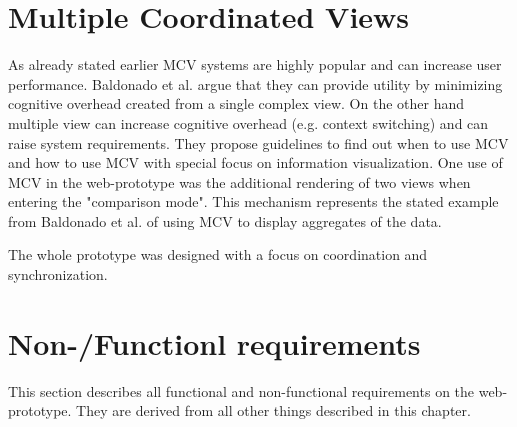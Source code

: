 \section{Multiple Coordinated Views}
As already stated earlier MCV systems are highly popular and can increase user performance. Baldonado et al. argue that they can provide utility
by minimizing cognitive overhead created from a single complex view. On the other hand multiple view can increase cognitive overhead
(e.g. context switching) and can raise system requirements. They propose guidelines to find out when to use MCV and how to use MCV
with special focus on information visualization. One use of MCV in the web-prototype was the additional rendering of two views when
entering the "comparison mode". This mechanism represents the stated example from Baldonado et al. of using MCV to display aggregates of
the data.

The whole prototype was designed with a focus on coordination and synchronization. 

\section{Non-/Functionl requirements}
This section describes all functional and non-functional requirements on the
web-prototype. They are derived from all other things described in this chapter.

